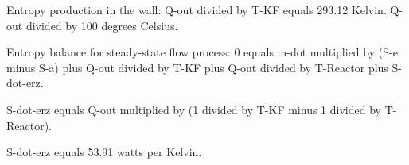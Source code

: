 Entropy production in the wall:  
Q-out divided by T-KF equals 293.12 Kelvin.  
Q-out divided by 100 degrees Celsius.  

Entropy balance for steady-state flow process:  
0 equals m-dot multiplied by (S-e minus S-a) plus Q-out divided by T-KF plus Q-out divided by T-Reactor plus S-dot-erz.  

S-dot-erz equals Q-out multiplied by (1 divided by T-KF minus 1 divided by T-Reactor).  

S-dot-erz equals 53.91 watts per Kelvin.